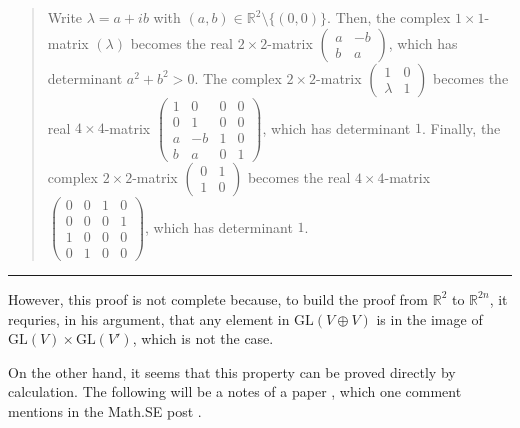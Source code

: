 \documentclass{article}
\numberwithin{equation}{subsection} %
\theoremstyle{definition}
\begin{document}
\begin{quote}
            Write $\lambda=a+ib$ with $(a,b) \in \mathbb{R}^2 \setminus \{(0,0)\}$. Then, the complex $1 \times 1$-matrix $(\lambda)$ becomes the real $2 \times 2$-matrix $\begin{pmatrix} a & -b \\ b & a \end{pmatrix}$, which has determinant $a^2+b^2 > 0$. The complex $2 \times 2$-matrix $\begin{pmatrix} 1 & 0 \\ \lambda & 1 \end{pmatrix}$ becomes the real $4 \times 4$-matrix
            $\begin{pmatrix}
            1 & 0 & 0 & 0 \\
            0 & 1 & 0 & 0 \\
            a & -b & 1 & 0 \\
            b & a & 0 & 1 \end{pmatrix}$, 
            which has determinant $1$. Finally, the complex $2 \times 2$-matrix  $\begin{pmatrix} 0 & 1 \\ 1 & 0 \end{pmatrix}$ becomes the real $4 \times 4$-matrix $\begin{pmatrix} 0 & 0 & 1 & 0 \\ 0 & 0 & 0 & 1\\ 1 & 0 & 0 & 0 \\ 0 & 1 & 0 & 0 \end{pmatrix}$, which has determinant $1$.

        \end{quote}
        \begin{center}\noindent\rule{8cm}{0.4pt}\end{center}
        
        However, this proof is not complete because, to build the proof from 
        $\mathbb{R}^2$ to $\mathbb{R}^{2n}$, it requries, in his argument,
        that any element in $\mathrm{GL}(V\oplus V)$ is in the image of
        $\mathrm{GL}(V)\times \mathrm{GL}(V')$, which is not the case.

        On the other hand, it seems that this property can be proved directly
        by calculation. The following will be a notes of a paper 
        \cite{determinants_of_block_m}, which one comment mentions 
        in the Math.SE post \cite{math.se_2}.

\end{document}
